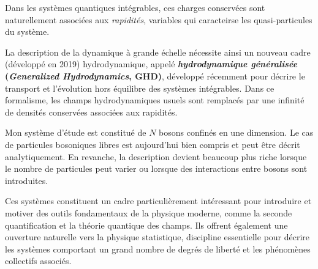 \smallskip

Dans les systèmes quantiques intégrables, ces charges conservées sont
naturellement associées aux \emph{rapidités}, variables qui caracteirse les
quasi-particules du système. %

\smallskip

La description de la dynamique à grande échelle nécessite ainsi un nouveau
cadre (développé en 2019) hydrodynamique, appelé {\bf\emph{hydrodynamique
    généralisée} (\emph{Generalized Hydrodynamics}, \textsf{GHD})}, développé
récemment pour décrire le transport et l’évolution hors équilibre des systèmes
intégrables. Dans ce formalisme, les champs hydrodynamiques usuels sont
remplacés par une infinité de densités conservées associées aux rapidités.



\smallskip

Mon système d’étude est constitué de $N$ bosons confinés en une dimension. Le
cas de particules bosoniques libres est aujourd’hui bien compris et peut être
décrit analytiquement. En revanche, la description devient beaucoup plus riche
lorsque le nombre de particules peut varier ou lorsque des interactions entre
bosons sont introduites.

Ces systèmes constituent un cadre particulièrement intéressant pour introduire
et motiver des outils fondamentaux de la physique moderne, comme la seconde
quantification et la théorie quantique des champs. Ils offrent également une
ouverture naturelle vers la physique statistique, discipline essentielle pour
décrire les systèmes comportant un grand nombre de degrés de liberté et les
phénomènes collectifs associés.


